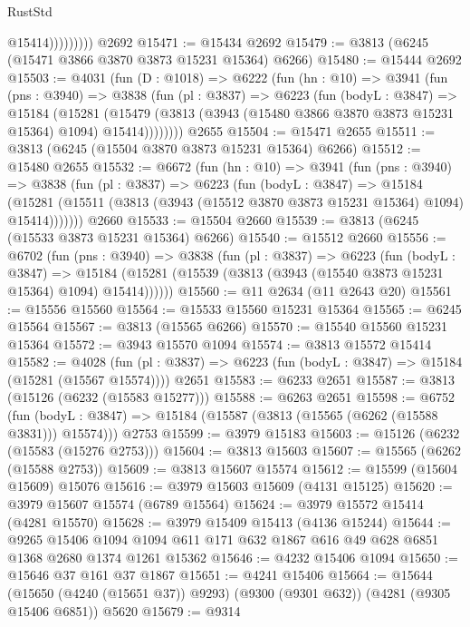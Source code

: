 \begin{lexlean}{RustStd}
\begin{coremodule}
{\begin{coremodule}
{{{{{{{{{{{{{{{{{{{{{{{{{{{{{{{{{{{                      @15414)))))))))
    @2692
@15471 := @15434 @2692
@15479 := @3813 (@6245 (@15471 @3866 @3870 @3873 @15231 @15364) @6266)
@15480 := @15444 @2692
@15503 := @4031
    (fun (D : @1018) =>
    @6222
      (fun (hn : @10) =>
      @3941
        (fun (pns : @3940) =>
        @3838
          (fun (pl : @3837) =>
          @6223
            (fun (bodyL : @3847) =>
            @15184
              (@15281
                (@15479 (@3813 (@3943 (@15480 @3866 @3870 @3873 @15231 @15364) @1094) @15414))))))))
    @2655
@15504 := @15471 @2655
@15511 := @3813 (@6245 (@15504 @3870 @3873 @15231 @15364) @6266)
@15512 := @15480 @2655
@15532 := @6672
    (fun (hn : @10) =>
    @3941
      (fun (pns : @3940) =>
      @3838
        (fun (pl : @3837) =>
        @6223
          (fun (bodyL : @3847) =>
          @15184
            (@15281 (@15511 (@3813 (@3943 (@15512 @3870 @3873 @15231 @15364) @1094) @15414)))))))
    @2660
@15533 := @15504 @2660
@15539 := @3813 (@6245 (@15533 @3873 @15231 @15364) @6266)
@15540 := @15512 @2660
@15556 := @6702
    (fun (pns : @3940) =>
    @3838
      (fun (pl : @3837) =>
      @6223
        (fun (bodyL : @3847) =>
        @15184 (@15281 (@15539 (@3813 (@3943 (@15540 @3873 @15231 @15364) @1094) @15414))))))
@15560 := @11 @2634 (@11 @2643 @20)
@15561 := @15556 @15560
@15564 := @15533 @15560 @15231 @15364
@15565 := @6245 @15564
@15567 := @3813 (@15565 @6266)
@15570 := @15540 @15560 @15231 @15364
@15572 := @3943 @15570 @1094
@15574 := @3813 @15572 @15414
@15582 := @4028
    (fun (pl : @3837) => @6223 (fun (bodyL : @3847) => @15184 (@15281 (@15567 @15574))))
    @2651
@15583 := @6233 @2651
@15587 := @3813 (@15126 (@6232 (@15583 @15277)))
@15588 := @6263 @2651
@15598 := @6752
    (fun (bodyL : @3847) => @15184 (@15587 (@3813 (@15565 (@6262 (@15588 @3831))) @15574)))
    @2753
@15599 := @3979 @15183
@15603 := @15126 (@6232 (@15583 (@15276 @2753)))
@15604 := @3813 @15603
@15607 := @15565 (@6262 (@15588 @2753))
@15609 := @3813 @15607 @15574
@15612 := @15599 (@15604 @15609) @15076
@15616 := @3979 @15603 @15609 (@4131 @15125)
@15620 := @3979 @15607 @15574 (@6789 @15564)
@15624 := @3979 @15572 @15414 (@4281 @15570)
@15628 := @3979 @15409 @15413 (@4136 @15244)
@15644 := @9265
    @15406
    @1094
    @1094
    @611
    @171
    @632
    @1867
    @616
    @49
    @628
    @6851
    @1368
    @2680
    @1374
    @1261
    @15362
@15646 := @4232 @15406 @1094
@15650 := @15646 @37 @161 @37 @1867
@15651 := @4241 @15406
@15664 := @15644
    (@15650 (@4240 (@15651 @37)) @9293)
    (@9300 (@9301 @632))
    (@4281 (@9305 @15406 @6851))
    @5620
@15679 := @9314
}}}}}}}}}}}}}}}}}}}}}}}}}}}}}}}}}}}
\end{coremodule}}
\end{coremodule}
\end{lexlean}
